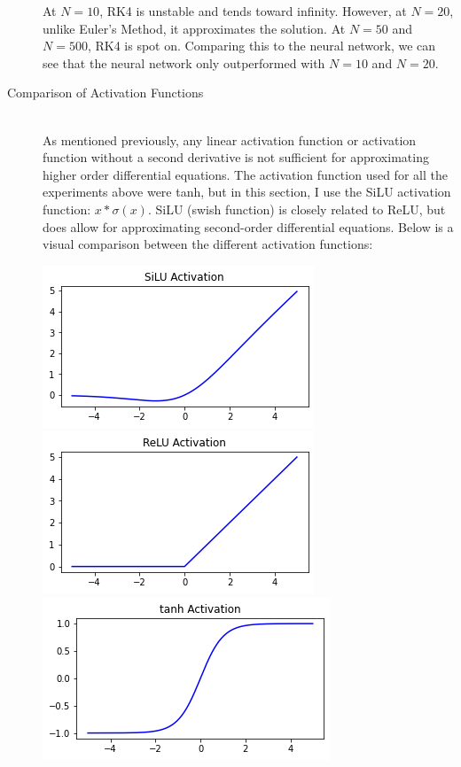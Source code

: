 \documentclass[12pt]{article}
\begin{document}
\begin{description}
\begin{minipage}{\linewidth}
    \end{minipage}
    At $N=10$, RK4 is unstable and tends toward infinity. However, at $N=20$,
    unlike Euler's Method, it approximates the solution. At $N=50$ and $N=500$,
    RK4 is spot on. Comparing this to the neural network, we can see that the
    neural network only outperformed with $N=10$ and $N=20$.
    \item[Comparison of Activation Functions] \hfill \\ 
    As mentioned previously, any linear activation function or activation
    function without a second derivative is not sufficient for approximating
    higher order differential equations. The activation function used for all
    the experiments above were tanh, but in this section, I use the SiLU
    activation function: $x * \sigma(x)$. SiLU (swish function) is closely
    related to ReLU, but does allow for approximating second-order differential
    equations. Below is a visual comparison between the different activation
    functions: \\
    \begin{minipage}{\linewidth}
        \centering
        \includegraphics[scale=.45]{images/silu.png}
        \includegraphics[scale=.45]{images/relu.png}
        \includegraphics[scale=.45]{images/tanh.png}

\end{minipage}
\end{description}
\end{document}
